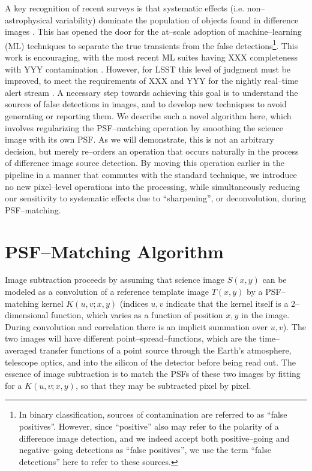 \documentclass[iop]{emulateapj}
\begin{document}
A key recognition of recent surveys is that systematic effects (i.e. non--astrophysical variability) dominate the population of objects found in difference images \citep{sdss2,panstarrs}.
This has opened the door for the at--scale adoption of machine--learning (ML) techniques to separate the true transients from the false detections\footnote{In binary classification, sources of contamination are referred to as ``false positives''.  However, since ``positive'' also may refer to the polarity of a difference image detection, and we indeed accept both positive--going and negative--going detections as ``false positives'', we use the term ``false detections'' here to refer to these sources.}\citep{josh}.
This work is encouraging, with the most recent ML suites having XXX completeness with YYY contamination \citep{ml}.
However, for LSST this level of judgment must be improved, to meet the requirements of XXX and YYY for the nightly real--time alert stream \citep{srd}.
A necessary step towards achieving this goal is to understand the sources of false detections in images, and to develop new techniques to avoid generating or reporting them.
We describe such a novel algorithm here, which involves regularizing the PSF--matching operation by smoothing the science image with its own PSF.
As we will demonstrate, this is not an arbitrary decision, but merely re--orders an operation that occurs naturally in the process of difference image source detection.
By moving this operation earlier in the pipeline in a manner that commutes with the standard technique, we introduce no new pixel--level operations into the processing, while simultaneously reducing our sensitivity to systematic effects due to ``sharpening'', or deconvolution, during PSF--matching.


\section{PSF--Matching Algorithm}

Image subtraction proceeds by assuming that science image $S(x,y)$ can be modeled as a convolution of a reference template image $T(x,y)$ by a PSF--matching kernel $K(u,v;x,y)$ (indices $u,v$ indicate that the kernel itself is a 2--dimensional function, which varies as a function of position $x,y$ in the image.
During convolution and correlation there is an implicit summation over $u,v$).
The two images will have different point--spread--functions, which are the time--averaged transfer functions of a point source through the Earth's atmosphere, telescope optics, and into the silicon of the detector before being read out.
The essence of image subtraction is to match the PSFs of these two images by fitting for a $K(u,v;x,y)$, so that they may be subtracted pixel by pixel.
\end{document}
